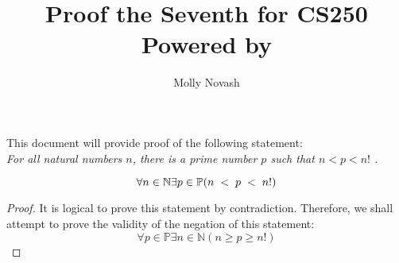 \documentclass[12pt]{article}
\author{Molly Novash}
\title{%
\Huge Proof the Seventh for CS250  \\
\normalsize Powered by \LaTeXe}
\begin{document}
\sloppy
\maketitle
\bigskip

This document will provide proof of the following statement: \\

\textit{For all natural numbers $n$, there is a prime number $p$ such that $n < p < n!$ \hspace{.1cm}.}
\bigskip

\begin{equation}
\forall n \in \mathbb{N}\exists p \in \mathbb{P}(n \hspace{.1cm}< \hspace{.1cm}p \hspace{.1cm}<\hspace{.1cm} n!)
\end{equation}
\bigskip

\begin{proof}
It is logical to prove this statement by contradiction. Therefore, we shall attempt to prove the validity of the negation of this statement: \\

\begin{equation}
\forall p \in \mathbb{P} \exists n \in \mathbb{N}(n \geq p \geq n!)
\end{equation}

\end{proof}
\end{document}

